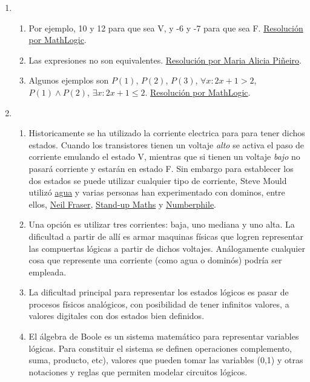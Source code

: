 \documentclass[a4paper]{article}
\newcommand{\exercise}{\item}
\begin{document}
\begin{enumerate}
\begin{enumerate} [label=(\alph*)]
		\item Razonamiento válido. \href{https://youtu.be/6QGZCc6QbVE}{Resolución por Maria Alicia Piñeiro} y su \href{https://youtu.be/C-BJgBFUIPA}{continuación}.
\end{enumerate}\exercise\begin{enumerate} [label=(\alph*)]		\item Por ejemplo, 10 y 12 para que sea V, y -6 y -7 para que sea F. \href{https://youtu.be/DLsV_L097gE?t=687}{Resolución por MathLogic}.
		\item Las expresiones no son equivalentes. \href{https://youtu.be/WC7P8FMIHFw}{Resolución por Maria Alicia Piñeiro}.
		\item Algunos ejemplos son $P(1)$, $P(2)$, $P(3)$, $\forall x: 2x+1>2$, $P(1) \land P(2)$, $\exists x: 2x+1 \leq 2$. \href{https://youtu.be/rnaCiSpVtP4?t=633}{Resolución por MathLogic}.
\end{enumerate}\exercise\begin{enumerate} [label=(\alph*)]		\item Historicamente se ha utilizado la corriente electrica para para tener dichos estados. Cuando los transistores tienen un voltaje \textit{alto} se activa el paso de corriente emulando el estado V, mientras que si tienen un voltaje \textit{bajo} no pasará corriente y estarán en estado F. Sin embargo para establecer los dos estados se puede utilizar cualquier tipo de corriente, Steve Mould utilizó \href{https://youtu.be/IxXaizglscw}{agua} y varias personas han experimentado con dominos, entre ellos, \href{https://youtu.be/SudixyugiX4}{Neil Fraser}, \href{https://youtu.be/OpLU__bhu2w}{Stand-up Maths} y \href{https://youtu.be/lNuPy-r1GuQ}{Numberphile}.  
		\item Una opción es utilizar tres corrientes: baja, uno mediana y uno alta. La dificultad a partir de allí es armar maquinas físicas que logren representar las compuertas lógicas a partir de dichos voltajes. Análogamente cualquier cosa que represente una corriente (como agua o dominós) podría ser empleada. 
		\item La dificultad principal para representar los estados lógicos es pasar de procesos físicos analógicos, con posibilidad de tener infinitos valores, a valores digitales con dos estados bien definidos. 
		\item El álgebra de Boole es un sistema matemático para representar variables lógicas. Para constituir el sistema se definen operaciones complemento, suma, producto, etc), valores que pueden tomar las variables (0,1) y otras notaciones y reglas que permiten modelar circuitos lógicos.

\end{enumerate}
\end{enumerate}
\end{document}
